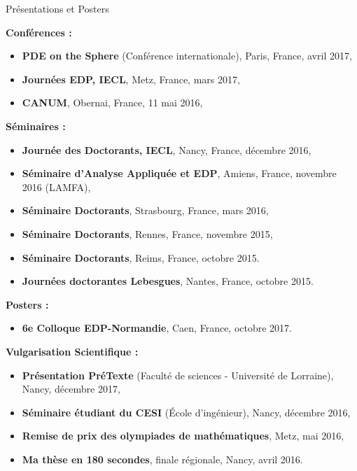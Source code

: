 \documentclass[10pt,a4paper]{report}
\def\cvpart{\noindent \hrulefill}
\def\sp{\vspace{6mm}}
\begin{document}
\sp
\noindent
{\selectfont
\begin{Large}
Présentations et Posters
\end{Large}
\cvpart
}
\sp

\noindent
{\selectfont
\textbf{Conférences :}
}

\begin{itemize}
\item \textbf{PDE on the Sphere} (Conférence internationale), Paris, France, avril 2017,
\item \textbf{Journées EDP, IECL}, Metz, France, mars 2017,
\item \textbf{CANUM}, Obernai, France, 11 mai 2016,
\end{itemize}

\vspace{0.3cm}
\noindent
{\selectfont
\textbf{Séminaires :}
}

\begin{itemize}
\item \textbf{Journée des Doctorants, IECL}, Nancy, France, décembre 2016,
\item \textbf{Séminaire d'Analyse Appliquée et EDP}, Amiens, France, novembre 2016 (LAMFA),
\item \textbf{Séminaire Doctorants}, Strasbourg, France, mars 2016,
\item \textbf{Séminaire Doctorants}, Rennes, France, novembre 2015,
\item \textbf{Séminaire Doctorants}, Reims, France, octobre 2015.
\item \textbf{Journées doctorantes Lebesgues}, Nantes, France, octobre 2015.
\end{itemize}

\vspace{0.3cm}
\noindent
{\selectfont
\textbf{Posters :}
}

\begin{itemize}
\item \textbf{6e Colloque EDP-Normandie}, Caen, France, octobre 2017.
\end{itemize}

\vspace{0.3cm}
\noindent
{\selectfont
\textbf{Vulgarisation Scientifique :}
}
\begin{itemize}
\item \textbf{Présentation PréTexte }(Faculté de sciences - Université de Lorraine), Nancy, décembre 2017,
\item \textbf{Séminaire étudiant du CESI }(\'Ecole d'ingénieur), Nancy, décembre 2016,
\item \textbf{Remise de prix des olympiades de mathématiques}, Metz, mai 2016,
\item \textbf{Ma thèse en 180 secondes}, finale régionale, Nancy, avril 2016.
\end{itemize}
\end{document}
